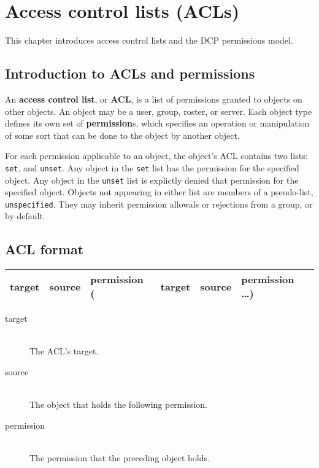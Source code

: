 \chapter{Access control lists (ACLs)}
\label{chap:acls}

This chapter introduces access control lists and the DCP permissions model.



\section{Introduction to ACLs and permissions}
\sectionrule

An \textbf{access control list}, or \textbf{ACL}, is a list of permissions
granted to objects on other objects.  An object may be a user, group, roster, or
server.  Each object type defines its own set of \textbf{permission}s, which
specifies an operation or manipulation of some sort that can be done to the
object by another object.

For each permission applicable to an object, the object's ACL contains two
lists: \texttt{set}, and \texttt{unset}.  Any object in the \texttt{set} list
has the permission for the specified object.  Any object in the \texttt{unset}
list is explictly denied that permission for the specified object.  Objects not
appearing in either list are members of a pseudo-list, \texttt{unspecified}.
They may inherit permission allowals or rejections from a group, or by default.



\section{ACL format}
\sectionrule
\label{acl:format}

\begin{tabular}{l|l|l|l|l|l}
  \hline
  target & source & permission ( & target & source & permission \ldots ) \\
  \hline
\end{tabular}

\begin{description}
  \item[target] \hfill \\
  The ACL's target.
  
  \item[source] \hfill \\
  The object that holds the following permission.
  
  \item[permission] \hfill \\
  The permission that the preceding object holds.
\end{description}



